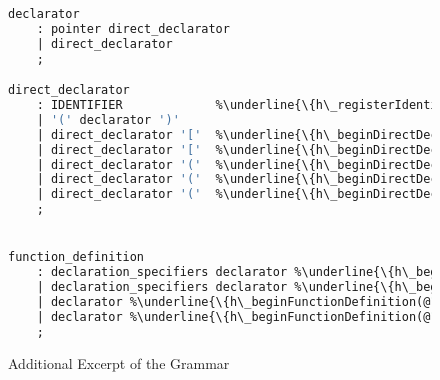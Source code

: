 \documentclass[12pt]{report}
\begin{document}
\begin{figure}
\begin{lstlisting}[language=Caml, escapechar=\%]
declarator
	: pointer direct_declarator
	| direct_declarator
	;

direct_declarator
	: IDENTIFIER			 %\underline{\{h\_registerIdentifier(@\$);\}}%
	| '(' declarator ')'
	| direct_declarator '['  %\underline{\{h\_beginDirectDeclarator(@1);\}}% constant_expression ']'	 %\underline{\{h\_endDirectDeclarator(@\$);\}}%
	| direct_declarator '['  %\underline{\{h\_beginDirectDeclarator(@1);\}}% ']'						%\underline{\{h\_endDirectDeclarator(@\$);\}}%
	| direct_declarator '('  %\underline{\{h\_beginDirectDeclarator(@1);\}}% parameter_type_list ')'	%\underline{\{h\_endDirectDeclarator(@\$);\}}%
	| direct_declarator '('  %\underline{\{h\_beginDirectDeclarator(@1);\}}% identifier_list ')'		%\underline{\{h\_endDirectDeclarator(@\$);\}}%
	| direct_declarator '('  %\underline{\{h\_beginDirectDeclarator(@1);\}}% ')'						%\underline{\{h\_endDirectDeclarator(@\$);\}}%
	;


function_definition
	: declaration_specifiers declarator %\underline{\{h\_beginFunctionDefinition(@2);\}}% declaration_list compound_statement %\underline{\{endFunctionDefinition(@\$);\}}%
	| declaration_specifiers declarator %\underline{\{h\_beginFunctionDefinition(@2);\}}%} compound_statement %\underline{\{endFunctionDefinition(@\$);\}}%
	| declarator %\underline{\{h\_beginFunctionDefinition(@1);\}}% declaration_list compound_statement %\underline{\{endFunctionDefinition(@\$);\}}%
	| declarator %\underline{\{h\_beginFunctionDefinition(@1);\}}% compound_statement %\underline{\{endFunctionDefinition(@\$);\}}
	;
\end{lstlisting}
\caption{Additional Excerpt of the Grammar}
\label{hookGrammar}
\end{figure}
\end{document}
